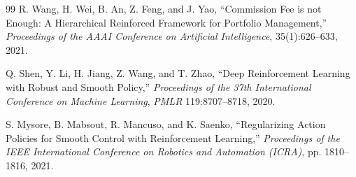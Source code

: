 \documentclass[10pt,twocolumn]{article}
\begin{document}
\begin{thebibliography}{99}
R. Wang, H. Wei, B. An, Z. Feng, and J. Yao, ``Commission Fee is not Enough: A Hierarchical Reinforced Framework for Portfolio Management,'' \emph{Proceedings of the AAAI Conference on Artificial Intelligence}, 35(1):626--633, 2021.

Q. Shen, Y. Li, H. Jiang, Z. Wang, and T. Zhao, ``Deep Reinforcement Learning with Robust and Smooth Policy,'' \emph{Proceedings of the 37th International Conference on Machine Learning}, \emph{PMLR} 119:8707--8718, 2020.

S. Mysore, B. Mabsout, R. Mancuso, and K. Saenko, ``Regularizing Action Policies for Smooth Control with Reinforcement Learning,'' \emph{Proceedings of the IEEE International Conference on Robotics and Automation (ICRA)}, pp. 1810--1816, 2021.
\end{thebibliography}
\end{document}

